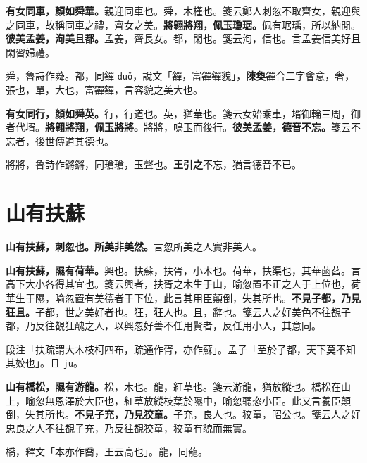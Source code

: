 \textbf{有女同車，顏如舜華。}{\footnotesize 親迎同車也。舜，木槿也。箋云鄭人刺忽不取齊女，親迎與之同車，故稱同車之禮，齊女之美。}\textbf{將翱將翔，佩玉瓊琚。}{\footnotesize 佩有琚瑀，所以納閒。}\textbf{彼美孟姜，洵美且都。}{\footnotesize 孟姜，齊長女。都，閑也。箋云洵，信也。言孟姜信美好且閑習婦禮。}

\begin{quoting}舜，魯詩作蕣。都，同奲 \texttt{duǒ}，說文「奲，富奲奲貌」，\textbf{陳奐}奲合二字會意，奢，張也，單，大也，富奲奲，言容貌之美大也。\end{quoting}

\textbf{有女同行，顏如舜英。}{\footnotesize 行，行道也。英，猶華也。箋云女始乘車，壻御輪三周，御者代壻。}\textbf{將翱將翔，佩玉將將。}{\footnotesize 將將，鳴玉而後行。}\textbf{彼美孟姜，德音不忘。}{\footnotesize 箋云不忘者，後世傳道其德也。}

\begin{quoting}將將，魯詩作鏘鏘，同瑲瑲，玉聲也。\textbf{王引之}不忘，猶言德音不已。\end{quoting}

\section{山有扶蘇}


\textbf{山有扶蘇，刺忽也。所美非美然。}{\footnotesize 言忽所美之人實非美人。}

\textbf{山有扶蘇，隰有荷華。}{\footnotesize 興也。扶蘇，扶胥，小木也。荷華，扶渠也，其華菡萏。言高下大小各得其宜也。箋云興者，扶胥之木生于山，喻忽置不正之人于上位也，荷華生于隰，喻忽置有美德者于下位，此言其用臣顛倒，失其所也。}\textbf{不見子都，乃見狂且。}{\footnotesize 子都，世之美好者也。狂，狂人也。且，辭也。箋云人之好美色不往覩子都，乃反往覩狂醜之人，以興忽好善不任用賢者，反任用小人，其意同。}

\begin{quoting}段注「扶疏謂大木枝柯四布，疏通作胥，亦作蘇」。孟子「至於子都，天下莫不知其姣也」。且 \texttt{jū}。\end{quoting}

\textbf{山有橋松，隰有游龍。}{\footnotesize 松，木也。龍，紅草也。箋云游龍，猶放縱也。橋松在山上，喻忽無恩澤於大臣也，紅草放縱枝葉於隰中，喻忽聽恣小臣。此又言養臣顛倒，失其所也。}\textbf{不見子充，乃見狡童。}{\footnotesize 子充，良人也。狡童，昭公也。箋云人之好忠良之人不往覩子充，乃反往覩狡童，狡童有貌而無實。}

\begin{quoting}橋，釋文「本亦作喬，王云高也」。龍，同蘢。\end{quoting}

